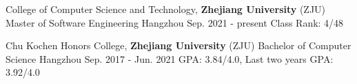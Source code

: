 \begin{cventries}

	\cventry
	{College of Computer Science and Technology, \textbf{Zhejiang University} (ZJU)} %
	{Master of Software Engineering} %
	{Hangzhou} %
	{Sep. 2021 - present} %
	{
		Class Rank: 4/48
	}%
	\vspace{1mm}

	\cventry
	{Chu Kochen Honors College, \textbf{Zhejiang University} (ZJU)} %
	{Bachelor of Computer Science} %
	{Hangzhou} %
	{Sep. 2017 - Jun. 2021} %
	{
		GPA: 3.84/4.0, Last two years GPA: 3.92/4.0
	}%
	\vspace{1mm}
 
\end{cventries}
